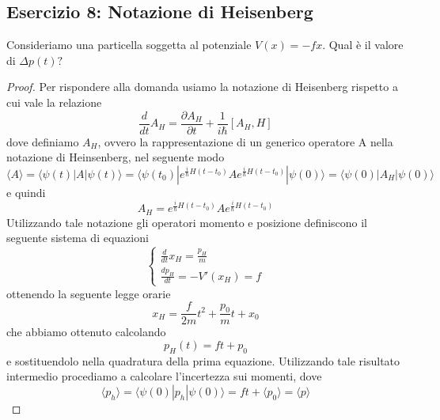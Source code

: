\subsection{Esercizio 8: Notazione di Heisenberg}

Consideriamo una particella soggetta al potenziale $V(x) = - fx$. Qual \`e il valore di $\Delta p(t) ?$

\begin{proof}
	Per rispondere alla domanda usiamo la notazione di Heisenberg rispetto a cui vale la relazione 
	\begin{equation*}
		\frac{d}{dt}A_H = \frac{\partial A_H}{\partial t} + \frac{1}{i \hbar}[A_H,H]
	\end{equation*}
	dove definiamo $A_H$, ovvero la rappresentazione di un generico operatore A nella notazione di Heinsenberg, nel seguente modo
	\begin{equation*}
		\langle A \rangle = \langle \psi(t) |A|\psi(t) \rangle = \langle \psi(t_0)|e^{\frac{i}{\hbar}H(t-t_0)}Ae^{\frac{i}{\hbar}H(t-t_0)}|\psi(0)\rangle   = \langle \psi(0)|A_H|\psi(0) \rangle 
	\end{equation*}
e quindi 
\begin{equation*}
	A_H = e^{\frac{i}{\hbar}H(t-t_0)}Ae^{\frac{i}{\hbar}H(t-t_0)}
\end{equation*}
Utilizzando tale notazione gli operatori momento e posizione definiscono il seguente sistema di equazioni
\begin{equation*}
	\left \{ \begin{array}{l}
		\frac{d}{dt}x_H = \frac{p_H}{m} \\[0.3cm]
	  \frac{d p_H}{dt} = -V'(x_H) = f
	\end{array}\right.
\end{equation*}	
ottenendo la seguente legge orarie
\begin{equation*}
x_H = \frac{f}{2m}t^2 + \frac{p_0}{m}t +x_0
\end{equation*}
che abbiamo ottenuto calcolando
\begin{equation*}
	p_H(t) = ft + p_0
\end{equation*}
e sostituendolo nella quadratura della prima equazione. Utilizzando tale risultato intermedio procediamo a calcolare l'incertezza sui momenti, dove
\begin{equation*}
	\langle p_h \rangle  = \langle \psi(0) | p_h |\psi(0) \rangle = ft + \langle p_0\rangle = \langle p \rangle  
\end{equation*} 
\newpage 



\end{proof}
